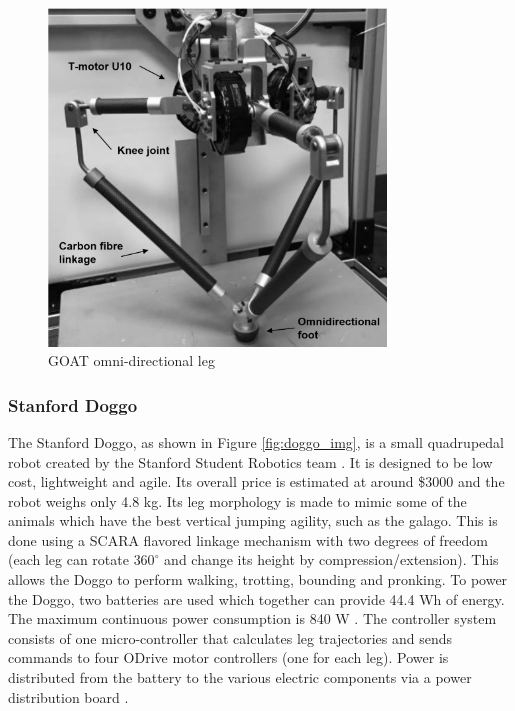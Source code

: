 \begin{figure}[H]
    \centering
    \includegraphics[width=0.8\textwidth]{Sections/LiteratureReview/img/goat/exsol_goat.png}
    \caption{GOAT omni-directional leg \cite{kalouche_design_2016}}
    \label{fig:goat_img}
\end{figure}

\subsubsection{Stanford Doggo}

The Stanford Doggo, as shown in Figure \ref{fig:doggo_img}, is a small quadrupedal robot created by the Stanford Student Robotics team \cite{kau_nate711/stanforddoggoproject_2019}. It is designed to be low cost, lightweight and agile. Its overall price is estimated at around \$3000 and the robot weighs only 4.8 kg. Its leg morphology is made to mimic some of the animals which have the best vertical jumping agility, such as the galago. This is done using a SCARA flavored linkage mechanism with two degrees of freedom (each leg can rotate $360^{\circ}$ and change its height by compression/extension). This allows the Doggo to perform walking, trotting, bounding and pronking. To power the Doggo, two batteries are used which together can provide 44.4 Wh of energy. The maximum continuous power consumption is 840 W \cite{kau_stanford_2019}. The controller system consists of one micro-controller that calculates leg trajectories and sends commands to four ODrive motor controllers (one for each leg). Power is distributed from the battery to the various electric components via a power distribution board \cite{kau_stanford_2019}. 

